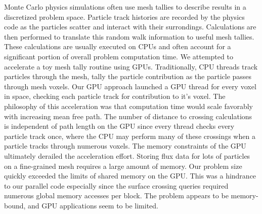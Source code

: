 \abstract
Monte Carlo physics simulations often use mesh tallies to describe results in a
discretized problem space. Particle track histories are recorded by the physics
code as the particles scatter and interact with their surrondings. Calculations
are then performed to translate this random walk information to useful mesh
tallies. These calculations are usually executed on CPUs and often account for a
significant portion of overall problem computation time. We attempted to
accelerate a toy mesh tally routine using GPUs. Traditionally, CPU threads track
particles through the mesh, tally the particle contribution as the particle
passes through mesh voxels. Our GPU approach launched a GPU thread for every
voxel in space, checking each particle track for contribution to it's voxel.
The philosophy of this acceleration was that computation time would scale
favorably with increasing mean free path. The number of distance to crossing
calculations is independent of path length on the GPU since every thread checks
every particle track once, where the CPU may perform many of these crossings
when a particle tracks through numerous voxels. The memory constraints of the
GPU ultimately derailed the acceleration effort. Storing flux data for lots of
particles on a fine-grained mesh requires a large amount of memory. Our problem
size quickly exceeded the limits of shared memory on the GPU. This was a
hindrance to our parallel code especially since the surface crossing queries
required numerous global memory accesses per block. The problem appears to be
memory-bound, and GPU applications seem to be limited.
